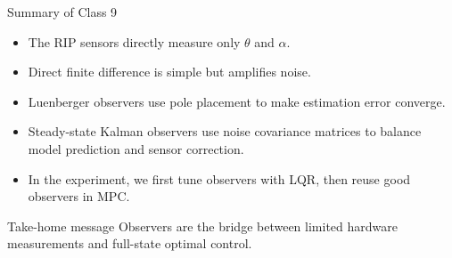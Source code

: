 \documentclass[aspectratio=169]{beamer}
\begin{document}
\begin{frame}{Summary of Class 9}
\begin{itemize}
    \item The RIP sensors directly measure only \(\theta\) and \(\alpha\).
    \vspace{0.25cm}
    \item Direct finite difference is simple but amplifies noise.
    \vspace{0.25cm}
    \item Luenberger observers use pole placement to make estimation error converge.
    \vspace{0.25cm}
    \item Steady-state Kalman observers use noise covariance matrices to balance model prediction and sensor correction.
    \vspace{0.25cm}
    \item In the experiment, we first tune observers with LQR, then reuse good observers in MPC.
\end{itemize}

\vspace{0.15cm}
\begin{alertblock}{Take-home message}
\small
Observers are the bridge between limited hardware measurements and full-state optimal control.
\end{alertblock}
\end{frame}
\end{document}
